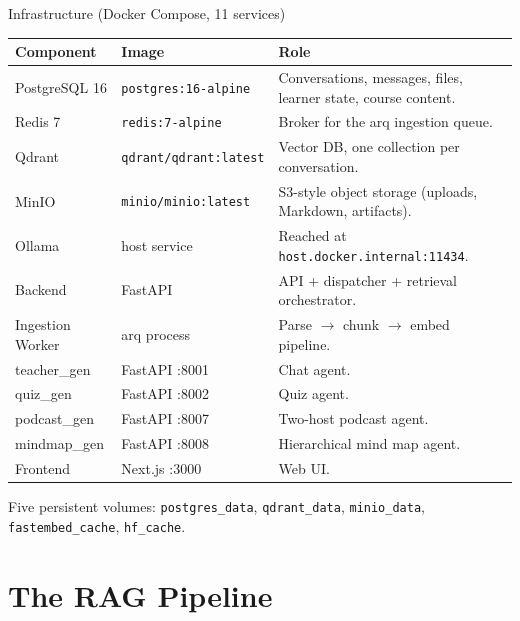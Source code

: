 \documentclass[aspectratio=169, 10pt]{beamer}
\begin{document}
\begin{frame}{Infrastructure (Docker Compose, 11 services)}
  \centering
  \scriptsize
  \renewcommand{\arraystretch}{1.2}
  \begin{tabular}{p{2.6cm} p{4.6cm} p{4.3cm}}
    \toprule
    \rowcolor{eduBlue!20}\textbf{Component} & \textbf{Image} & \textbf{Role} \\
    \midrule
    PostgreSQL 16        & \texttt{postgres:16-alpine}      & Conversations, messages, files, learner state, course content. \\
    Redis 7              & \texttt{redis:7-alpine}          & Broker for the arq ingestion queue. \\
    Qdrant               & \texttt{qdrant/qdrant:latest}    & Vector DB, one collection per conversation. \\
    MinIO                & \texttt{minio/minio:latest}      & S3-style object storage (uploads, Markdown, artifacts). \\
    Ollama               & host service                     & Reached at \texttt{host.docker.internal:11434}. \\
    Backend              & FastAPI                          & API + dispatcher + retrieval orchestrator. \\
    Ingestion Worker     & arq process                      & Parse $\to$ chunk $\to$ embed pipeline. \\
    teacher\_gen         & FastAPI :8001                    & Chat agent. \\
    quiz\_gen            & FastAPI :8002                    & Quiz agent. \\
    podcast\_gen         & FastAPI :8007                    & Two-host podcast agent. \\
    mindmap\_gen         & FastAPI :8008                    & Hierarchical mind map agent. \\
    Frontend             & Next.js :3000                    & Web UI. \\
    \bottomrule
  \end{tabular}

  \vspace{0.1cm}
  \footnotesize Five persistent volumes: \texttt{postgres\_data},
  \texttt{qdrant\_data}, \texttt{minio\_data}, \texttt{fastembed\_cache},
  \texttt{hf\_cache}.
\end{frame}

\section{The RAG Pipeline}
\end{document}
